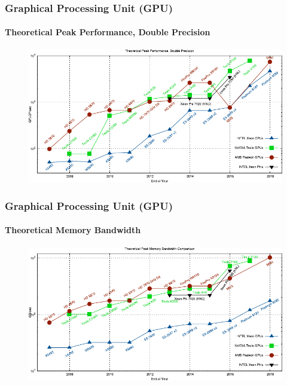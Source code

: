 \documentclass[aspectratio=1610]{beamer}
\begin{document}
\begin{frame}
    \frametitle{Graphical Processing Unit (GPU)}
    \framesubtitle{Theoretical Peak Performance, Double Precision}
    
    \begin{figure}
        \centering
        \includegraphics[height=0.95\textheight]{images/gpu-peak-performance.pdf}
        
    \end{figure}
\end{frame}

\begin{frame}
    \frametitle{Graphical Processing Unit (GPU)}
    \framesubtitle{Theoretical Memory Bandwidth}
    
    \begin{figure}
        \centering
        \includegraphics[height=0.95\textheight]{images/gpu-memory-bandwidth.pdf}
        
    \end{figure}
\end{frame}
\end{document}
